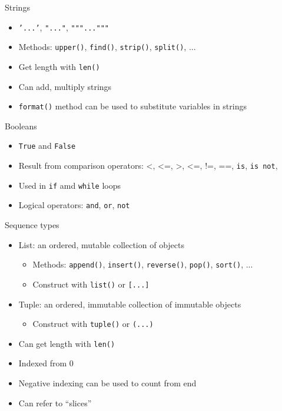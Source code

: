 \documentclass[noamssymb,svgnames]{beamer}
\newcommand{\obj}[1]{\texttt{\color{darkblue}#1}}
\begin{document}
\begin{frame}{Strings}
  \begin{itemize}
  \item \obj{'...'}, \obj{"..."}, \obj{"""..."""}
  \item Methods: \obj{upper()}, \obj{find()}, \obj{strip()},
    \obj{split()}, ...
  \item Get length with \obj{len()}
  \item Can add, multiply strings
  \item \obj{format()} method can be used to substitute variables in strings
  \end{itemize}
\end{frame}

\begin{frame}{Booleans}
  \begin{itemize}
  \item \obj{True} and \obj{False}
  \item Result from comparison operators: <, <=, >, <=, !=, ==, \obj{is},
    \obj{is not},
  \item Used in \obj{if} amd \obj{while} loops
  \item Logical operators: \obj{and}, \obj{or}, \obj{not}
  \end{itemize}
\end{frame}

\begin{frame}{Sequence types}
  \begin{itemize}
  \item List: an ordered, mutable collection of objects
    \begin{itemize}
    \item Methods: \obj{append()}, \obj{insert()}, \obj{reverse()},
      \obj{pop()}, \obj{sort()}, ...
    \item Construct with \obj{list()} or \obj{[...]}
    \end{itemize}
  \item Tuple: an ordered, immutable collection of immutable objects
    \begin{itemize}
    \item Construct with \obj{tuple()} or \obj{(...)}
    \end{itemize}
  \item Can get length with \obj{len()}
  \item Indexed from 0
  \item Negative indexing can be used to count from end
  \item Can refer to ``slices''
  \end{itemize}
\end{frame}
\end{document}
